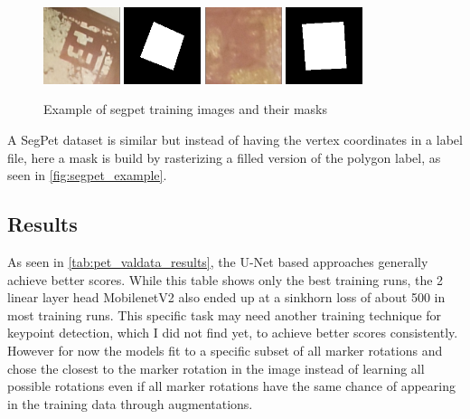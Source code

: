 \documentclass[10pt]{book}
\begin{document}
\begin{figure}
  \centering
     {\includegraphics[width=0.2\textwidth]{image/segpet_example_in}}
     {\includegraphics[width=0.2\textwidth]{image/segpet_example_seg}}
     {\includegraphics[width=0.2\textwidth]{image/segpet_example_2_in}}
     {\includegraphics[width=0.2\textwidth]{image/segpet_example_2_seg}}
  \caption{Example of segpet training images and their masks}
  \label{fig:segpet_example}
\end{figure}

A SegPet dataset is similar but instead of having the vertex coordinates in a label file, here a mask is build by rasterizing a filled version of the polygon label, as seen in \autoref{fig:segpet_example}.

\subsection{Results}

As seen in \autoref{tab:pet_valdata_results}, the U-Net based approaches generally achieve better scores. While this table shows only the best training runs, the 2 linear layer head MobilenetV2 also ended up at a sinkhorn loss of about 500 in most training runs. This specific task may need another training technique for keypoint detection, which I did not find yet, to achieve better scores consistently. However for now the models fit to a specific subset of all marker rotations and chose the closest to the marker rotation in the image instead of learning all possible rotations even if all marker rotations have the same chance of appearing in the training data through augmentations. 
\end{document}

